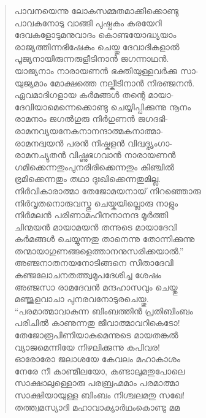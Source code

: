 \begin{verse}
പാവനയെന്നു ലോകസമ്മതമാക്കിക്കൊണ്ടു\\
പാവകനോടു വാങ്ങി പുഷ്പകം കരയേറി\\
ദേവകളോടുമനുവാദം കൊണ്ടയോദ്ധ്യയാം\\
രാജ്യത്തിന്നഭിഷേകം ചെയ്തു ദേവാദികളാല്‍\\
പൂജ്യനായിരുന്നരുളീടിനാന്‍ ജഗന്നാഥന്‍.\\
യാജ്യനാം നാരായണന്‍ ഭക്തിയുള്ളവര്‍ക്കു സാ-\\
യുജ്യമാം മോക്ഷത്തെ നല്കീടിനാന്‍ നിരഞ്ജനന്‍.\\
ഏവമാദിഗളായ കര്‍മങ്ങള്‍ തന്റെ മായാ-\\
ദേവിയാമെന്നെക്കൊണ്ടു ചെയ്യിപ്പിക്കുന്നു നൂനം\\
രാമനാം ജഗല്‍ഗുരു നിര്‍ഗുണന്‍ ജഗദഭി-\\
രാമനവ്യയനേകനാനന്ദാത്മകനാത്മാ-\\
രാമനദ്വയന്‍ പരന്‍ നിഷ്കളന്‍ വിദ്വദ്ഭൃംഗാ-\\
രാമനച്യുതന്‍ വിഷ്ണുഭഗവാന്‍ നാരായണന്‍\\
ഗമിക്കെന്നതുംപുനരിരിക്കെന്നതും കിഞ്ചില്‍\\
ഭ്രമിക്കെന്നതും തഥാ ദുഃഖിക്കെന്നതുമില്ല.\\
നിര്‍വികാരാത്മാ തേജോമയനായ് നിറഞ്ഞൊരു\\
നിര്‍വൃതനൊരുവസ്തു ചെയ്കയില്ലൊരു നാളും\\
നിര്‍മലന്‍ പരിണാമഹീനനാനന്ദ മൂര്‍ത്തി\\
ചിന്മയന്‍ മായാമയന്‍ തന്നുടെ മായാദേവി\\
കര്‍മങ്ങള്‍ ചെയ്യുന്നതു താനെന്നു തോന്നിക്കുന്നു\\
തന്മായാഗുണങ്ങളെത്താനനുസരിക്കയാല്‍.”\\
അഞ്ജനാതനയനോടിങ്ങനെ സീതാദേവി\\
കഞ്ജലോചനതത്ത്വമുപദേശിച്ച ശേഷം\\
അഞ്ജസാ രാമദേവന്‍ മന്ദഹാസവും ചെയ്തു\\
മഞ്ജുളവാചാ പുനരവനോടുരചെയ്തു.\\
“പരമാത്മാവാകുന്ന ബിംബത്തിന്‍ പ്രതിബിംബം\\
പരിചില്‍ കാണുന്നതു ജീവാത്മാവറികെടോ!\\
തേജോരൂപിണിയാകുമെന്നുടെ മായതങ്കല്‍\\
വ്യാജമെന്നിയേ നിഴലിക്കുന്നു കപിവര!\\
ഓരോരോ ജലാശയേ കേവലം മഹാകാശം\\
നേരേ നീ കാണ്മീലയോ, കണ്ടാലുമതുപോലെ\\
സാക്ഷാലുള്ളൊരു പരബ്രഹ്മമാം പരമാത്മാ\\
സാക്ഷിയായുള്ള ബിംബം നിശ്ചലമതു സഖേ!\\
തത്ത്വമസ്യാദി മഹാവാക്യാര്‍ഥംകൊണ്ടു മമ\\

\end{verse}
